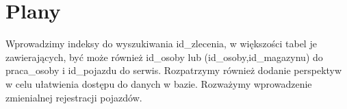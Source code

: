 \documentclass{article} %
\begin{document}
\section*{Plany}
    Wprowadzimy indeksy do wyszukiwania id\_zlecenia, w większości tabel je zawierających, być może również id\_osoby lub (id\_osoby,id\_magazynu) do praca\_osoby i id\_pojazdu do serwis. Rozpatrzymy również dodanie perspektyw w celu ułatwienia dostępu do danych w bazie. Rozważymy wprowadzenie zmienialnej rejestracji pojazdów.
\end{document}
